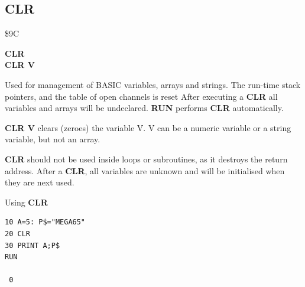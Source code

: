 
\newpage
\subsection{CLR}
\begin{description}[leftmargin=2cm,style=nextline]
\item [Token:] \$9C
\item [Format:] {\bf CLR}        \\
                {\bf CLR V}
\item [Usage:] Used for management of BASIC variables, arrays
               and strings. The run-time stack pointers,
               and the table of open channels is reset
               After executing a {\bf CLR} all variables and arrays will be undeclared.
               {\bf RUN} performs {\bf CLR} automatically.

               {\bf CLR V} clears (zeroes) the variable V.
               V can be a numeric variable or a string variable, but not
               an array.

\item [Remarks:] {\bf CLR} should not be used inside loops or
               subroutines, as it destroys the return address.
               After a {\bf CLR}, all variables are unknown and will
               be initialised when they are next used.

\item [Example:] Using {\bf CLR}
\begin{tcolorbox}[colback=black,coltext=white]
\verbatimfont{\codefont}
\begin{verbatim}
10 A=5: P$="MEGA65"
20 CLR
30 PRINT A;P$
RUN

 0
\end{verbatim}
\end{tcolorbox}
\end{description}


\newpage

